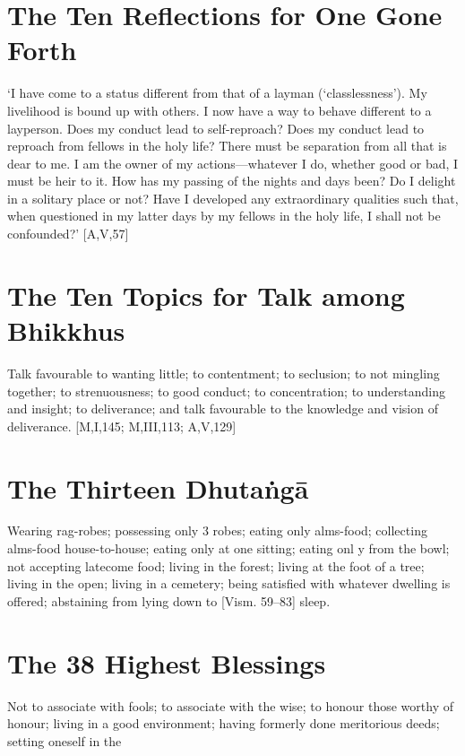 \section{The Ten Reflections for One Gone Forth}

‘I have come to a status different from that of
a layman (‘classlessness’). My livelihood is
bound up with others. I now have a way to
behave different to a layperson. Does my conduct lead to self-reproach? Does my conduct
lead to reproach from fellows in the holy life?
There must be separation from all that is dear
to me. I am the owner of my actions—whatever I do, whether good or bad, I must be heir
to it. How has my passing of the nights and
days been? Do I delight in a solitary place or
not? Have I developed any extraordinary qualities such that, when questioned in my latter
days by my fellows in the holy life, I shall not
be confounded?’
[A,V,57]

\section{The Ten Topics for Talk among Bhikkhus}

Talk favourable to wanting little; to contentment; to seclusion; to not mingling together;
to strenuousness; to good conduct; to concentration; to understanding and insight; to
deliverance; and talk favourable to the knowledge and vision of deliverance.
[M,I,145; M,III,113; A,V,129]

\section{The Thirteen Dhutaṅgā}

Wearing rag-robes; possessing only 3 robes;
eating only alms-food; collecting alms-food
house-to-house; eating only at one sitting; eating onl y from the bowl; not accepting latecome food; living in the forest; living at the
foot of a tree; living in the open; living in a
cemetery; being satisfied with whatever dwelling is offered; abstaining from lying down to
[Vism. 59–83]
sleep.

\section{The 38 Highest Blessings}

Not to associate with fools; to associate with
the wise; to honour those worthy of honour;
living in a good environment; having formerly
done meritorious deeds; setting oneself in the

